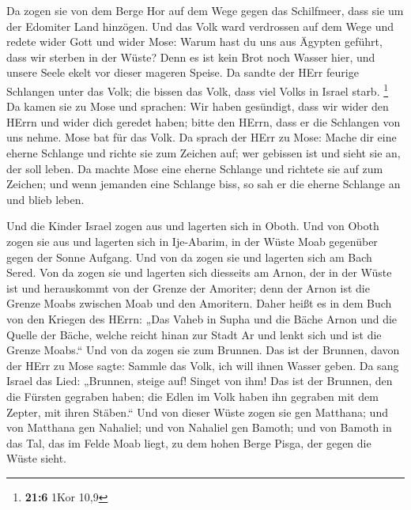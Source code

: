  Da zogen sie von dem Berge Hor auf dem Wege gegen das
Schilfmeer, dass sie um der Edomiter Land hinzögen. Und das Volk ward
verdrossen auf dem Wege  und redete wider Gott und wider
Mose: Warum hast du uns aus Ägypten geführt, dass wir sterben in der
Wüste? Denn es ist kein Brot noch Wasser hier, und unsere Seele ekelt
vor dieser mageren Speise.  Da sandte der HErr feurige
Schlangen unter das Volk; die bissen das Volk, dass viel Volks in Israel
starb. \footnote{\textbf{21:6} 1Kor 10,9}  Da kamen sie zu
Mose und sprachen: Wir haben gesündigt, dass wir wider den HErrn und
wider dich geredet haben; bitte den HErrn, dass er die Schlangen von uns
nehme. Mose bat für das Volk.  Da sprach der HErr zu Mose:
Mache dir eine eherne Schlange und richte sie zum Zeichen auf; wer
gebissen ist und sieht sie an, der soll leben.  Da machte
Mose eine eherne Schlange und richtete sie auf zum Zeichen; und wenn
jemanden eine Schlange biss, so sah er die eherne Schlange an und blieb
leben.

 Und die Kinder Israel zogen aus und lagerten sich in
Oboth.  Und von Oboth zogen sie aus und lagerten sich in
Ije-Abarim, in der Wüste Moab gegenüber gegen der Sonne Aufgang.
 Und von da zogen sie und lagerten sich am Bach Sered.
 Von da zogen sie und lagerten sich diesseits am Arnon,
der in der Wüste ist und herauskommt von der Grenze der Amoriter; denn
der Arnon ist die Grenze Moabs zwischen Moab und den Amoritern.
 Daher heißt es in dem Buch von den Kriegen des HErrn:
„Das Vaheb in Supha und die Bäche Arnon  und die Quelle
der Bäche, welche reicht hinan zur Stadt Ar und lenkt sich und ist die
Grenze Moabs.``  Und von da zogen sie zum Brunnen. Das
ist der Brunnen, davon der HErr zu Mose sagte: Sammle das Volk, ich will
ihnen Wasser geben.  Da sang Israel das Lied: „Brunnen,
steige auf! Singet von ihm!  Das ist der Brunnen, den die
Fürsten gegraben haben; die Edlen im Volk haben ihn gegraben mit dem
Zepter, mit ihren Stäben.`` Und von dieser Wüste zogen sie gen Matthana;
 und von Matthana gen Nahaliel; und von Nahaliel gen
Bamoth;  und von Bamoth in das Tal, das im Felde Moab
liegt, zu dem hohen Berge Pisga, der gegen die Wüste sieht.

